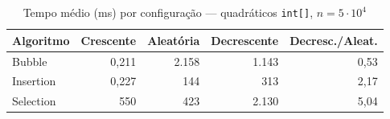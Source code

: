 \begin{table}[htbp]\centering\small
\caption{Tempo médio (ms) por configuração — quadráticos \texttt{int[]}, $n = 5\cdot10^4$}\label{tab:cfg-int-50k}
\begin{tabular}{lrrrr}
\toprule
Algoritmo & Crescente & Aleatória & Decrescente & Decresc./Aleat. \\
\midrule
Bubble & 0,211 & 2.158 & 1.143 & 0,53 \\
Insertion & 0,227 & 144 & 313 & 2,17 \\
Selection & 550 & 423 & 2.130 & 5,04 \\
\bottomrule
\end{tabular}
\end{table}